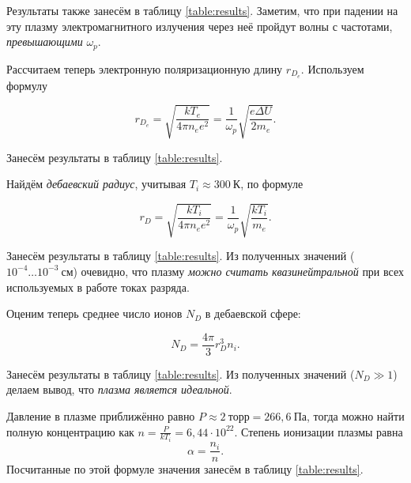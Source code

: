 \documentclass[a4paper, 12pt]{article}
\begin{document}
    Результаты также занесём в таблицу \ref{table:results}. Заметим, что при падении на эту плазму электромагнитного излучения через неё пройдут волны с частотами, \textit{превышающими} $\omega_p$.

    Рассчитаем теперь электронную поляризационную длину $r_{D_e}$. Используем формулу

    \begin{equation}
        r_{D_e} = \sqrt{\frac{kT_e}{4\pi n_ee^2}} = \frac{1}{\omega_p} \sqrt{\frac{e\Delta U}{2m_e}}.
    \end{equation}
    
    Занесём результаты в таблицу \ref{table:results}.

    Найдём \textit{дебаевский радиус}, учитывая $T_i\approx300~\text{К}$, по формуле

    \begin{equation}
        r_{D} = \sqrt{\frac{kT_i}{4\pi n_ee^2}} = \frac{1}{\omega_p} \sqrt{\frac{kT_i}{m_e}}.
    \end{equation}
    
     Занесём результаты в таблицу \ref{table:results}. Из полученных значений ($10^{-4}\ldots10^{-3}~\text{см}$) очевидно, что плазму \textit{можно считать квазинейтральной} при всех используемых в работе токах разряда.

    Оценим теперь среднее число ионов $N_D$ в дебаевской сфере:
    
    \begin{equation}
        N_D=\frac{4\pi}{3}r_D^3n_i.
    \end{equation}
    
    Занесём результаты в таблицу \ref{table:results}. Из полученных значений ($N_D \gg 1$) делаем вывод, что \textit{плазма является идеальной}.

    Давление в плазме приближённо равно $P \approx 2~\text{торр} = 266,6~\text{Па}$, тогда можно найти полную концентрацию как $n = \frac{P}{kT_i} = 6,44 \cdot 10^{22}$. Степень ионизации плазмы равна\[\alpha=\frac{n_i}{n}.\] Посчитанные по этой формуле значения занесём в таблицу \ref{table:results}.
    
\end{document}
